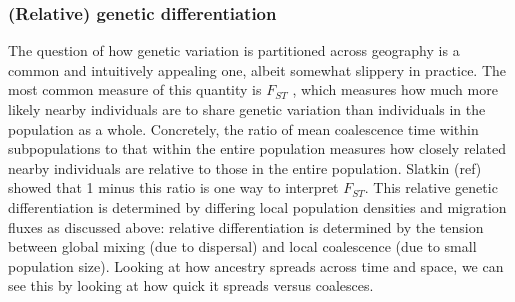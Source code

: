 \documentclass{ar-1col}
\newcommand{\g}[1]{{\color{blue}{#1}}}
\newcommand{\todo}[1]{{\textbf{\color{red}{#1}}}}
\begin{document}

\subsubsection{(Relative) genetic differentiation}

The question of how genetic variation is partitioned across
geography is a common and intuitively appealing one,
albeit somewhat slippery in practice.
The most common measure of this quantity is $F_{ST}$ \cite{wright},
which measures how much more likely nearby individuals are to share genetic variation than individuals in the population as a whole.
Concretely,
the ratio of mean coalescence time within subpopulations
to that within the entire population measures how closely related
nearby individuals are relative to those in the entire population.
Slatkin (ref) showed that 1 minus this ratio is one way to interpret $F_{ST}$.
This relative genetic differentiation is determined by differing local population densities
and migration fluxes as discussed above:
relative differentiation is determined by the tension between global mixing (due to dispersal)
and local coalescence (due to small population size).
Looking at how ancestry spreads across time and space,
we can see this by looking at how quick it spreads versus coalesces.

\todo{tidy and conclude}

\g{refer to ancestry spread figure to build intuition 
for how ancestors can``forget" where their descendants are, 
leading to an asymptote in ibd}
\end{document}
